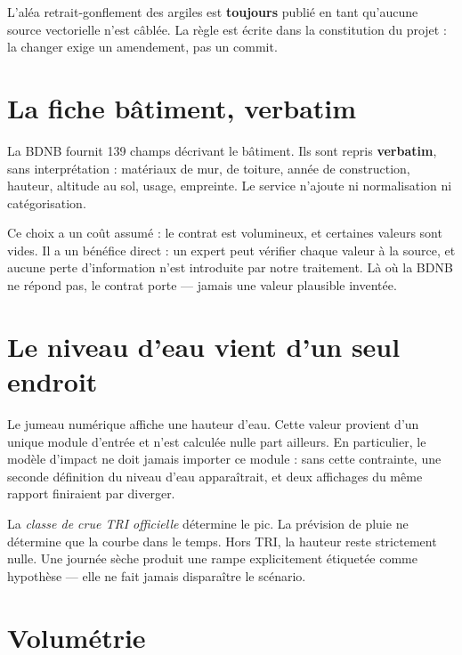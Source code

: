 \begin{invariant}[title={L'argile reste une estimation communale}]
L'aléa retrait-gonflement des argiles est \textbf{toujours} publié en
 tant qu'aucune source vectorielle n'est câblée. La
règle est écrite dans la constitution du projet : la changer exige un
amendement, pas un commit.
\end{invariant}

\section{La fiche bâtiment, verbatim}

La BDNB fournit 139 champs décrivant le bâtiment. Ils sont repris
\textbf{verbatim}, sans interprétation : matériaux de mur, de toiture, année de
construction, hauteur, altitude au sol, usage, empreinte. Le service n'ajoute ni
normalisation ni catégorisation.

Ce choix a un coût assumé : le contrat est volumineux, et certaines valeurs sont
vides. Il a un bénéfice direct : un expert peut vérifier chaque valeur à la
source, et aucune perte d'information n'est introduite par notre traitement. Là
où la BDNB ne répond pas, le contrat porte  — jamais une valeur
plausible inventée.

\section{Le niveau d'eau vient d'un seul endroit}

Le jumeau numérique affiche une hauteur d'eau. Cette valeur provient d'un unique
module d'entrée et n'est calculée nulle part ailleurs. En particulier, le modèle
d'impact ne doit jamais importer ce module : sans cette contrainte, une seconde
définition du niveau d'eau apparaîtrait, et deux affichages du même rapport
finiraient par diverger.

\begin{invariant}[title={Le scénario fixe le niveau, la pluie n'en fixe que la forme}]
La \emph{classe de crue TRI officielle} détermine le pic. La prévision de pluie ne
détermine que la courbe dans le temps. Hors TRI, la hauteur reste strictement
nulle. Une journée sèche produit une rampe explicitement étiquetée comme
hypothèse — elle ne fait jamais disparaître le scénario.
\end{invariant}

\section{Volumétrie}

